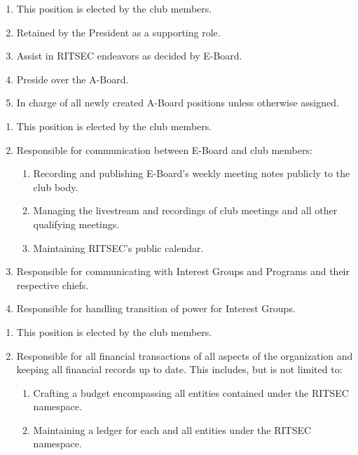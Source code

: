 
\begin{enumerate}
	\item This position is elected by the club members.
	\item Retained by the President as a supporting role.
	\item Assist in RITSEC endeavors as decided by E-Board.
	\item Preside over the A-Board.
	\item In charge of all newly created A-Board positions unless otherwise assigned.
\end{enumerate}


\begin{enumerate}
	\item This position is elected by the club members.
	\item Responsible for communication between E-Board and club members:
	      \begin{enumerate}
		      \item Recording and publishing E-Board's weekly meeting notes publicly to the club
		            body.
		      \item Managing the livestream and recordings of club meetings and all other
		            qualifying meetings.
		      \item Maintaining RITSEC's public calendar.
	      \end{enumerate}
	\item Responsible for communicating with Interest Groups and Programs and their
	      respective chiefs.
	\item Responsible for handling transition of power for Interest Groups.
\end{enumerate}


\begin{enumerate}
	\item This position is elected by the club members.
	\item Responsible for all financial transactions of all aspects of the organization
	      and keeping all financial records up to date. This includes, but is not limited
	      to:
	      \begin{enumerate}
		      \item Crafting a budget encompassing all entities contained under the RITSEC
		            namespace.
		      \item Maintaining a ledger for each and all entities under the RITSEC namespace.
	      \end{enumerate}
\end{enumerate}

